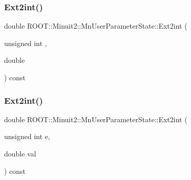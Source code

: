 \subsubsection{\texorpdfstring{Ext2int()}{Ext2int()}\hspace{0.1cm}{\footnotesize\ttfamily [1/3]}}
{\footnotesize\ttfamily double R\+O\+O\+T\+::\+Minuit2\+::\+Mn\+User\+Parameter\+State\+::\+Ext2int (\begin{DoxyParamCaption}\item[{unsigned int}]{,  }\item[{double}]{ }\end{DoxyParamCaption}) const}

\mbox{\label{classROOT_1_1Minuit2_1_1MnUserParameterState_a8e0b79e3a150b2ccd15678755b1adb4a}} 
\subsubsection{\texorpdfstring{Ext2int()}{Ext2int()}\hspace{0.1cm}{\footnotesize\ttfamily [2/3]}}
{\footnotesize\ttfamily double R\+O\+O\+T\+::\+Minuit2\+::\+Mn\+User\+Parameter\+State\+::\+Ext2int (\begin{DoxyParamCaption}\item[{unsigned int}]{e,  }\item[{double}]{val }\end{DoxyParamCaption}) const}

